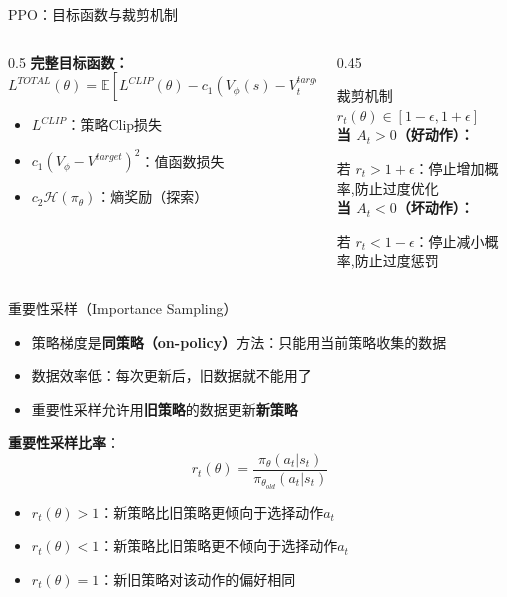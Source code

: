 \documentclass{beamer}
\begin{document}
\begin{frame}{PPO：目标函数与裁剪机制}
    \begin{columns}[T]
        \begin{column}{0.5\textwidth}
            \textbf{完整目标函数：}
            \[ L^{TOTAL}(\theta) = \mathbb{E} \left[ L^{CLIP}(\theta) - c_1 (V_\phi(s) - V_t^{target})^2 + c_2 \mathcal{H}(\pi_\theta(\cdot|s)) \right] \]
            
            \vspace{0.3cm}

                \begin{itemize}
                    \item $L^{CLIP}$：策略Clip损失
                    \item $c_1 (V_\phi - V^{target})^2$：值函数损失
                    \item $c_2 \mathcal{H}(\pi_\theta)$：熵奖励（探索）
                \end{itemize}
        \end{column}
        
        \begin{column}{0.45\textwidth}
    \vspace*{1.5cm}
\begin{block}{裁剪机制}\\
         $r_t(\theta) \in [1-\epsilon, 1+\epsilon]$\\
    \textbf{当 $A_t > 0$（好动作）：}
     \item 若 $r_t > 1+\epsilon$：停止增加概率,防止过度优化\\
    \textbf{当 $A_t < 0$（坏动作）：}
    \item 若 $r_t < 1-\epsilon$：停止减小概率,防止过度惩罚
\end{block}
\end{column}
\end{columns}
\end{frame}

\begin{frame}{重要性采样（Importance Sampling）}

        \begin{itemize}
            \item 策略梯度是\textbf{同策略（on-policy）}方法：只能用当前策略收集的数据
            \item 数据效率低：每次更新后，旧数据就不能用了
            \item 重要性采样允许用\textbf{旧策略}的数据更新\textbf{新策略}
        \end{itemize}

    \textbf{重要性采样比率}：
        \[
        r_t(\theta) = \frac{\pi_\theta(a_t|s_t)}{\pi_{\theta_{old}}(a_t|s_t)}
        \]

    \begin{itemize}
        \item $r_t(\theta) > 1$：新策略比旧策略更倾向于选择动作$a_t$
        \item $r_t(\theta) < 1$：新策略比旧策略更不倾向于选择动作$a_t$
        \item $r_t(\theta) = 1$：新旧策略对该动作的偏好相同
    \end{itemize}
\end{frame}
\end{document}
